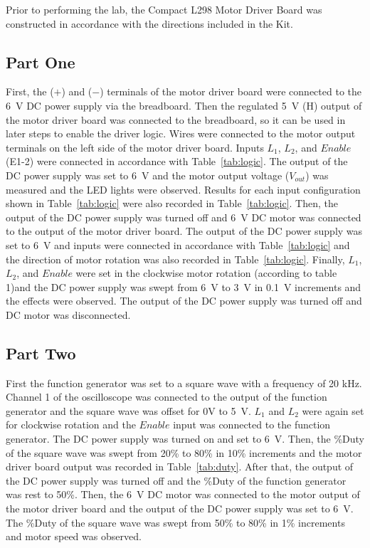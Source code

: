 Prior to performing the lab, the Compact L298 Motor Driver Board was constructed in accordance with the directions included in the Kit.

\subsection{Part One}
\label{sec:part_one}

First, the ($+$) and ($-$) terminals of the motor driver board were connected to the \SI{6}{V} DC power supply via the breadboard.  Then the regulated \SI{+5}{V} (H) output of the motor driver board was connected to the breadboard, so it can be used in later steps to enable the driver logic.  Wires were connected to the motor output terminals on the left side of the motor driver board.  Inputs $L_1$, $L_2$, and $Enable$ (E1-2) were connected in accordance with Table~\ref{tab:logic}.  The output of the DC power supply was set to \SI{6}{V} and the motor output voltage ($V_{out}$) was measured and the LED lights were observed.  Results for each input configuration shown in Table~\ref{tab:logic} were also recorded in Table~\ref{tab:logic}.  Then, the output of the DC power supply was turned off and \SI{6}{V} DC motor was connected to the output of the motor driver board.  The output of the DC power supply was set to \SI{6}{V} and inputs were connected in accordance with Table~\ref{tab:logic} and the direction of motor rotation was also recorded in Table~\ref{tab:logic}.  Finally, $L_1$, $L_2$, and $Enable$ were set in the clockwise motor rotation (according to table 1)and the DC power supply was swept from \SI{6}{V} to \SI{3}{V} in \SI{0.1}{V} increments and the effects were observed.  The output of the DC power supply was turned off and DC motor was disconnected.

\subsection{Part Two}
\label{sec:part_two}

First the function generator was set to a square wave with a frequency of 20 kHz.  Channel 1 of the oscilloscope was connected to the output of the function generator and the square wave was offset for 0V to \SI{5}{V}.  $L_1$ and $L_2$ were again set for clockwise rotation and the $Enable$ input was connected to the function generator.  The DC power supply was turned on and set to \SI{6}{V}.  Then, the \%Duty of the square wave was swept from 20\% to 80\% in 10\% increments and the motor driver board output was recorded in Table~\ref{tab:duty}.  After that, the output of the DC power supply was turned off and the \%Duty of the function generator was rest to 50\%.  Then, the \SI{6}{V} DC motor was connected to the motor output of the motor driver board and the output of the DC power supply was set to \SI{6}{V}.  The \%Duty of the square wave was swept from 50\% to 80\% in 1\% increments and motor speed was observed.


